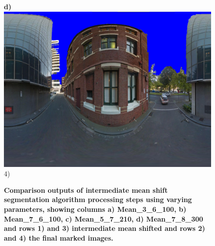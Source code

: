\documentclass[final,3p,times,authoryear]{elsarticle}
\begin{document}
\begin{figure}
\textbf{d)}\includegraphics[scale=0.08]{Images/mean/0070_7_8_300_ms_sky_mark.png} 4)

\caption{\bf Comparison outputs of intermediate mean shift segmentation algorithm processing steps using varying parameters, showing columns a) Mean\_3\_6\_100, b) Mean\_7\_6\_100, c) Mean\_5\_7\_210, d) Mean\_7\_8\_300 and rows 1) and 3) intermediate mean shifted and rows 2) and 4) the final marked images. }
 \label{fig:meantypes}  
\end{figure} 
\end{document}
